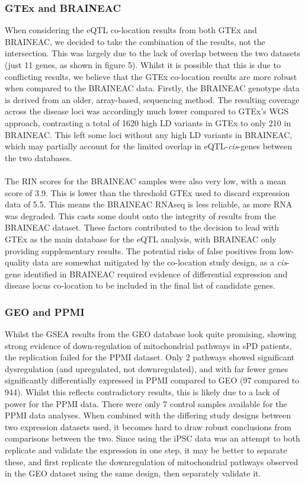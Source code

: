 \documentclass{article}
\begin{document}
\subsubsection{GTEx and BRAINEAC}
When considering the eQTL co-location results from both GTEx and BRAINEAC, we decided to take the combination of the results, not the intersection. This was largely due to the lack of overlap between the two datasets (just 11 genes, as shown in figure 5). Whilst it is possible that this is due to conflicting results, we believe that the GTEx co-location results are more robust when compared to the BRAINEAC data. Firstly, the BRAINEAC genotype data is derived from an older, array-based, sequencing method. The resulting coverage across the disease loci was accordingly much lower compared to GTEx's WGS approach, contrasting a total of 1620 high LD variants in GTEx to only 210 in BRAINEAC. This left some loci without any high LD variants in BRAINEAC, which may partially account for the limited overlap in eQTL-\textit{cis}-genes between the two databases. 
\\
\\The RIN scores for the BRAINEAC samples were also very low, with a mean score of 3.9. This is lower than the threshold GTEx used to discard expression data of 5.5\cite{Aguet2020TheTissues}. This means the BRAINEAC RNAseq is less reliable, as more RNA was degraded. This casts some doubt onto the integrity of results from the BRAINEAC dataset. These factors contributed to the decision to lead with GTEx as the main database for the eQTL analysis, with BRAINEAC only providing supplementary results. The potential risks of false positives from low-quality data are somewhat mitigated by the co-location study design, as a \textit{cis}-gene identified in BRAINEAC required evidence of differential expression and disease locus co-location to be included in the final list of candidate genes.
\subsubsection{GEO and PPMI}
\label{subsubsec:GEOandPPMI}
Whilst the GSEA results from the GEO database look quite promising, showing strong evidence of down-regulation of mitochondrial pathways in sPD patients, the replication failed for the PPMI dataset. Only 2 pathways showed significant dysregulation (and upregulated, not downregulated), and with far fewer genes significantly differentially expressed in PPMI compared to GEO (97 compared to 944). Whilst this reflects contradictory results, this is likely due to a lack of power for the PPMI data. There were only 7 control samples available for the PPMI data analyses. When combined with the differing study designs between two expression datasets used, it becomes hard to draw robust conclusions from comparisons between the two. Since using the iPSC data was an attempt to both replicate and validate the expression in one step, it may be better to separate these, and first replicate the downregulation of mitochondrial pathways observed in the GEO dataset using the same design, then separately validate it.
\end{document}
